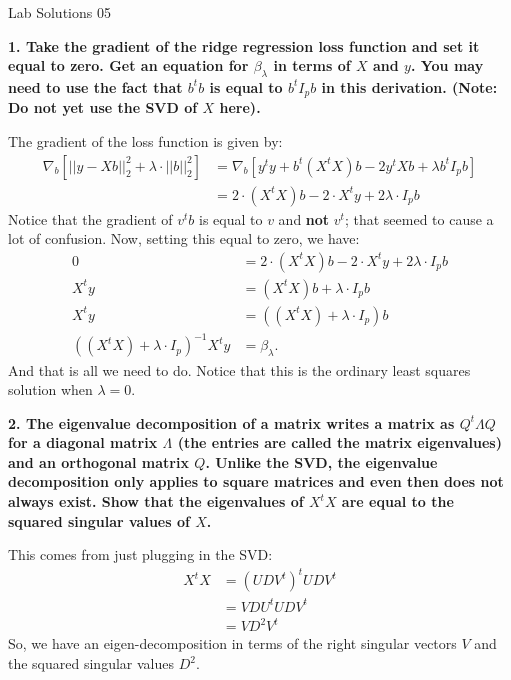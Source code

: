 \documentclass[12pt,hidelinks]{article}
\numberwithin{equation}{section}
\begin{document}
{\LARGE Lab Solutions 05}

\vspace*{12pt}

\textbf{1. Take the gradient of the ridge regression loss function and set it equal
to zero. Get an equation for $\beta_{\lambda}$ in terms of $X$ and $y$. You may
need to use the fact that $b^t b$ is equal to $b^t I_p b$ in this derivation.
(Note: Do \textbf{not} yet use the SVD of $X$ here).}

\vspace*{12pt}

The gradient of the loss function is given by:
\begin{align}
\nabla_b \left[ || y - X b ||_2^2 + \lambda \cdot || b ||_2^2 \right] &=
\nabla_b \left[ y^t y + b^t (X^t X) b - 2 y^t X b + \lambda b^t I_p b \right] \\
&= 2 \cdot (X^t X) b - 2 \cdot X^t y + 2\lambda \cdot I_p b
\end{align}
Notice that the gradient of $v^t b$ is equal to $v$ and \textbf{not} $v^t$; that
seemed to cause a lot of confusion. Now, setting this equal to zero, we have:
\begin{align}
0 &= 2 \cdot (X^t X) b - 2 \cdot X^t y + 2\lambda \cdot I_p b \\
X^t y &= (X^t X) b + \lambda \cdot I_p b \\
X^t y &= \left((X^t X) + \lambda \cdot I_p \right) b \\
\left((X^t X) + \lambda \cdot I_p \right)^{-1} X^t y &= \beta_\lambda.
\end{align}
And that is all we need to do. Notice that this is the ordinary least squares
solution when $\lambda = 0$.


\vspace*{12pt}

\textbf{2. The eigenvalue decomposition of a matrix writes a matrix as $Q^t \Lambda Q$ for
a diagonal matrix $\Lambda$ (the entries are called the matrix eigenvalues) and an
orthogonal matrix $Q$. Unlike the SVD, the eigenvalue decomposition only applies to
square matrices and even then does not always exist. Show that the eigenvalues of
$X^t X$ are equal to the squared singular values of $X$.}

\vspace*{12pt}

This comes from just plugging in the SVD:
\begin{align}
X^t X &= (UDV^t)^{t} UDV^t \\
&= V D U^t U D V^t \\
&= V D^2 V^t
\end{align}
So, we have an eigen-decomposition in terms of the right singular vectors $V$
and the squared singular values $D^2$.
\end{document}
